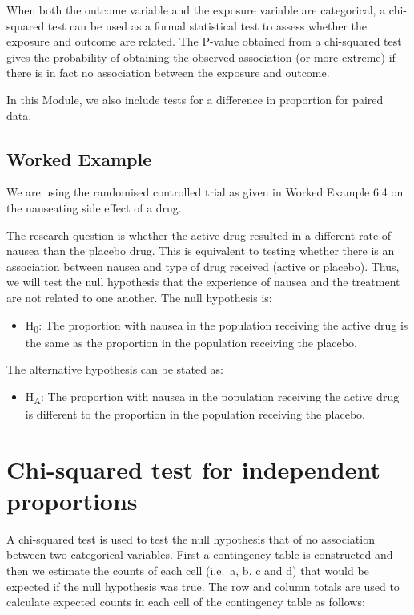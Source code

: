 \documentclass[
  a4paper,
]{memoir}
\providecommand{\tightlist}{%
  \setlength{\itemsep}{0pt}\setlength{\parskip}{0pt}}
\begin{document}
When both the outcome variable and the exposure variable are
categorical, a chi-squared test can be used as a formal statistical test
to assess whether the exposure and outcome are related. The P-value
obtained from a chi-squared test gives the probability of obtaining the
observed association (or more extreme) if there is in fact no
association between the exposure and outcome.

In this Module, we also include tests for a difference in proportion for
paired data.

\subsection{Worked Example}\label{worked-example-4}

We are using the randomised controlled trial as given in Worked Example
6.4 on the nauseating side effect of a drug.

The research question is whether the active drug resulted in a different
rate of nausea than the placebo drug. This is equivalent to testing
whether there is an association between nausea and type of drug received
(active or placebo). Thus, we will test the null hypothesis that the
experience of nausea and the treatment are not related to one another.
The null hypothesis is:

\begin{itemize}
\tightlist
\item
  H\textsubscript{0}: The proportion with nausea in the population
  receiving the active drug is the same as the proportion in the
  population receiving the placebo.
\end{itemize}

The alternative hypothesis can be stated as:

\begin{itemize}
\tightlist
\item
  H\textsubscript{A}: The proportion with nausea in the population
  receiving the active drug is different to the proportion in the
  population receiving the placebo.
\end{itemize}

\section{Chi-squared test for independent
proportions}\label{chi-squared-test-for-independent-proportions}

A chi-squared test is used to test the null hypothesis that of no
association between two categorical variables. First a contingency table
is constructed and then we estimate the counts of each cell (i.e.~a, b,
c and d) that would be expected if the null hypothesis was true. The row
and column totals are used to calculate expected counts in each cell of
the contingency table as follows:
\end{document}
